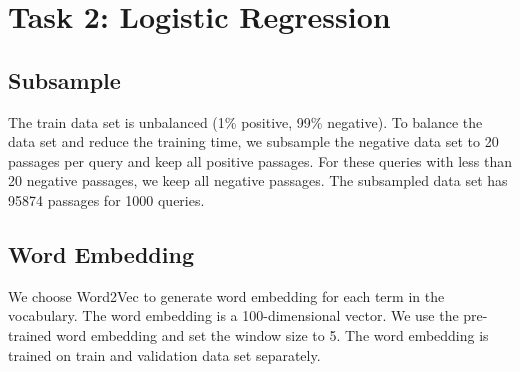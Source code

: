 \section{Task 2: Logistic Regression}
\subsection{Subsample}
The train data set is unbalanced (1\% positive, 99\% negative). To balance the data set and reduce the training time, we subsample the negative data set to 20 passages per query and keep all positive passages. For these queries with less than 20 negative passages, we keep all negative passages. The subsampled data set has 95874 passages for 1000 queries.
\subsection{Word Embedding}
We choose Word2Vec to generate word embedding for each term in the vocabulary. The word embedding is a 100-dimensional vector. We use the pre-trained word embedding and set the window size to 5. The word embedding is trained on train and validation data set separately.
